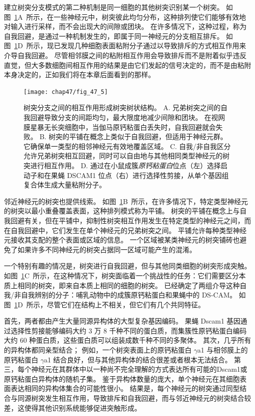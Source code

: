 建立树突分支模式的第二种机制是同一细胞的其他树突识别某一个树突。
如图~\ref{fig:47_5}A~所示，在一些神经元中，树突彼此均匀分布，这种排列使它们能够有效地对输入进行采样，而不会出现大的间隙或团块。
在许多情况下，这种过程，称为自我回避，是通过一种机制发生的，即属于同一神经元的分支相互排斥。
如图~\ref{fig:47_5}D~所示，现已发现几种细胞表面粘附分子通过以导致排斥的方式相互作用来介导自我回避。
尽管相邻膜之间的粘附相互作用会导致排斥而不是附着似乎违反直觉，但大多数细胞间相互作用的结果是由它们发起的信号决定的，而不是由粘附本身决定的，正如我们将在本章后面看到的那样。


\begin{figure}[htbp]
	\centering
	\texttt{[image: chap47/fig\_47\_5]}
	\caption{树突分支之间的相互作用形成树突树状结构。
		A. 兄弟树突之间的自我回避导致分支的间距均匀，最大限度地减少间隙和团块。
		在视网膜星暴无长突细胞中，当伽马原钙粘蛋白丢失时，自我回避就会失败。
		B. 树突的平铺在概念上类似于自我回避，但适用于神经元群。
		它确保单一类型的相邻神经元有效地覆盖区域。
		C. 自我/非自我区分允许兄弟树突相互回避，同时可以自由地与其他相同类型神经元的树突进行相互作用。
		D. 通过在小鼠成簇\textit{原钙粘蛋白}位点（左）选择启动子和在果蝇 DSCAM1 位点（右）进行选择性剪接，从单个基因组复合体生成大量粘附分子。}
	\label{fig:47_5}
\end{figure}


邻近神经元的树突也提供线索。
如图~\ref{fig:47_5}B~所示，在许多情况下，特定类型神经元的树突以最小重叠覆盖表面，这种排列模式称为平铺。
树突的平铺在概念上与自我回避有关，但在平铺中，抑制性树突相互作用发生在特定类型的神经元之间，而在自我回避中，它们发生在单个神经元的兄弟树突之间。
平铺允许每种类型神经元接收其支配的整个表面或区域的信息。
一个区域被某类神经元的树突铺砖也避免了如果许多不同神经元的树突占据同一区域可能产生的混淆。


一个特别有趣的情况是，树突进行自我回避，但与其他同类细胞的树突形成突触。
如图~\ref{fig:47_5}C~所示，在这种情况下，树突面临着一个挑战性的任务：它们需要区分本质上相同的树突，即来自本质上相同的细胞的树突。
已经确定了两组介导这种自我/非自我辨别的分子：哺乳动物中的成簇原钙粘蛋白和果蝇中的 DS-CAM。
如图~\ref{fig:47_5}D~所示，尽管它们在结构上不相关，但它们有几个共同特征。


首先，两者都由产生大量同源异构体的大型复杂基因编码。
果蝇 Dscam1 基因通过选择性剪接能够编码大约 3 万 8 千种不同的蛋白质，而集簇性原钙粘蛋白编码大约 60 种蛋白质，这些蛋白质可以组装成数千种不同的多聚体。
其次，几乎所有的异构体都同亲型结合；
例如，一个树突表面上的原钙粘蛋白 $\gamma$a1 与相邻膜上的原钙粘蛋白 $\gamma$a1 结合良好，但与其他异构体的结合很差或者根本无法结合。
第三，每个神经元在其群体中以一种尚不完全理解的方式表达所有可能的Dscam1或原钙粘蛋白异构体的随机子集。
鉴于异构体数量的庞大，单个神经元在其细胞表面表达相同的异构体集合的可能性很小。
结果是，每个神经元的树突通过同型结合与同源树突发生相互作用，导致排斥和自我回避，而与邻近神经元的树突结合较差，这使得其他识别系统能够促进突触形成。


